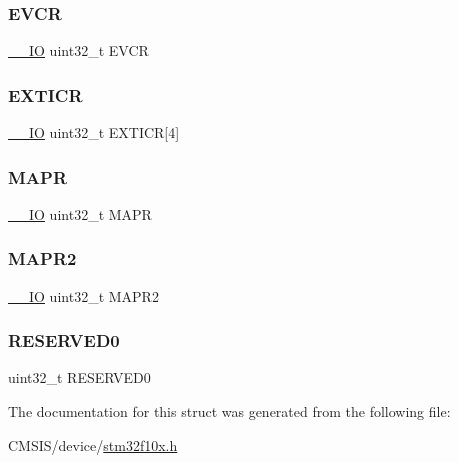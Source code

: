 \subsubsection{\texorpdfstring{EVCR}{EVCR}}
{\footnotesize\ttfamily \mbox{\hyperlink{core__sc300_8h_aec43007d9998a0a0e01faede4133d6be}{\+\_\+\+\_\+\+IO}} uint32\+\_\+t E\+V\+CR}

\mbox{\label{struct_a_f_i_o___type_def_a52f7bf8003ba69d66a4e86dea6eeab65}} 
\subsubsection{\texorpdfstring{EXTICR}{EXTICR}}
{\footnotesize\ttfamily \mbox{\hyperlink{core__sc300_8h_aec43007d9998a0a0e01faede4133d6be}{\+\_\+\+\_\+\+IO}} uint32\+\_\+t E\+X\+T\+I\+CR\mbox{[}4\mbox{]}}

\mbox{\label{struct_a_f_i_o___type_def_a9f3b56f295c863e23ed4c82380b1d621}} 
\subsubsection{\texorpdfstring{MAPR}{MAPR}}
{\footnotesize\ttfamily \mbox{\hyperlink{core__sc300_8h_aec43007d9998a0a0e01faede4133d6be}{\+\_\+\+\_\+\+IO}} uint32\+\_\+t M\+A\+PR}

\mbox{\label{struct_a_f_i_o___type_def_a12f2941917fe1e4000af10d1793f8e49}} 
\subsubsection{\texorpdfstring{MAPR2}{MAPR2}}
{\footnotesize\ttfamily \mbox{\hyperlink{core__sc300_8h_aec43007d9998a0a0e01faede4133d6be}{\+\_\+\+\_\+\+IO}} uint32\+\_\+t M\+A\+P\+R2}

\mbox{\label{struct_a_f_i_o___type_def_af86c61a5d38a4fc9cef942a12744486b}} 
\subsubsection{\texorpdfstring{RESERVED0}{RESERVED0}}
{\footnotesize\ttfamily uint32\+\_\+t R\+E\+S\+E\+R\+V\+E\+D0}



The documentation for this struct was generated from the following file\+:\begin{DoxyCompactItemize}
\item 
C\+M\+S\+I\+S/device/\mbox{\hyperlink{stm32f10x_8h}{stm32f10x.\+h}}\end{DoxyCompactItemize}
